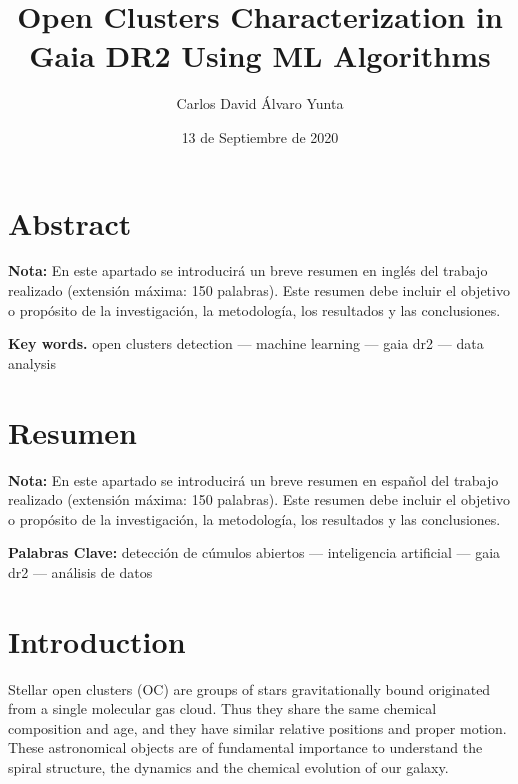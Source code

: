 \documentclass[11pt, a4paper, english]{book}
\title{Open Clusters Characterization in Gaia DR2 Using ML Algorithms}
\author{Carlos David Álvaro Yunta}
\date{13 de Septiembre de 2020}
\begin{document}

\maketitle

\frontmatter
\tableofcontents
\listoffigures
\listoftables

\chapter{Abstract}

{\bf Nota:} En este apartado se introducirá un breve resumen en inglés del trabajo realizado (extensión máxima: 150 palabras).
Este resumen debe incluir el objetivo o propósito de la investigación, la metodología, los resultados y las conclusiones.

\medskip

{\bf Key words.} open clusters detection --- machine learning --- gaia dr2 --- data analysis

\chapter{Resumen}

{\bf Nota:} En este apartado se introducirá un breve resumen en español del trabajo realizado (extensión máxima: 150 palabras).
Este resumen debe incluir el objetivo o propósito de la investigación, la metodología, los resultados y las conclusiones.

\medskip

{\bf Palabras Clave:} detección de cúmulos abiertos --- inteligencia artificial --- gaia dr2 --- análisis de datos

\mainmatter
\chapter{Introduction}

Stellar open clusters (OC) are groups of stars gravitationally bound originated from a single molecular gas cloud.
Thus they share the same chemical composition and age, and they have similar relative positions and proper motion.
These astronomical objects are of fundamental importance to understand the spiral structure,
the dynamics and the chemical evolution of our galaxy.
\end{document}
